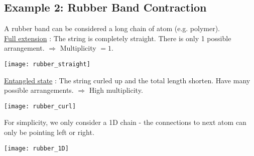 \documentclass[class=article, crop=false, 12pt]{standalone}
\begin{document}
\subsection{Example 2: Rubber Band Contraction}

A rubber band can be considered a long chain of atom (e.g. polymer).\\

\ul{Full extension} : The string is completely straight.
There is only 1 possible arrangement. 
$\Rightarrow$ Multiplicity $=1$.

\begin{center}
    \begin{minipage}{0.6\linewidth}
        \centering
        \texttt{[image: rubber\_straight]}
    \end{minipage}
\end{center}


\ul{Entangled state} : The string curled up and the total length shorten.
Have many possible arrangements.
$\Rightarrow$ High multiplicity.

\begin{center}
    \begin{minipage}{0.6\linewidth}
        \centering
        \texttt{[image: rubber\_curl]}
    \end{minipage}
\end{center}

For simplicity, we only consider a 1D chain - 
the connections to next atom can only be pointing left or right.

\begin{center}
    \begin{minipage}{0.6\linewidth}
        \centering
        \texttt{[image: rubber\_1D]}
    \end{minipage}
\end{center}
\end{document}
